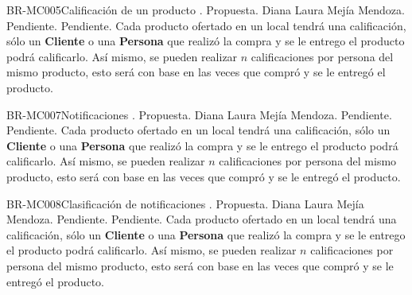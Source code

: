 
\begin{BusinessRule}{BR-MC005}{Calificación de un producto}{}{}{}
	.
	\BRItem[Estado] Propuesta.
	 Diana Laura Mejía Mendoza.
	 Pendiente.
	 Pendiente.
	\BRItem[Descripción] Cada producto ofertado en un local tendrá una calificación, sólo un \textbf{Cliente} o una \textbf{Persona} que realizó la compra y se le entrego el producto podrá calificarlo. Así mismo, se pueden realizar $n$ calificaciones por persona del mismo producto, esto será con base en las veces que compró y se le entregó el producto.
	\BRItem[Sentencia] 
	
\end{BusinessRule}


\begin{BusinessRule}{BR-MC007}{Notificaciones}{}{}{}
	.
	\BRItem[Estado] Propuesta.
	 Diana Laura Mejía Mendoza.
	 Pendiente.
	 Pendiente.
	\BRItem[Descripción] Cada producto ofertado en un local tendrá una calificación, sólo un \textbf{Cliente} o una \textbf{Persona} que realizó la compra y se le entrego el producto podrá calificarlo. Así mismo, se pueden realizar $n$ calificaciones por persona del mismo producto, esto será con base en las veces que compró y se le entregó el producto.
	\BRItem[Sentencia] 
	
\end{BusinessRule}


\begin{BusinessRule}{BR-MC008}{Clasificación de notificaciones}{}{}{}
	.
	\BRItem[Estado] Propuesta.
	 Diana Laura Mejía Mendoza.
	 Pendiente.
	 Pendiente.
	\BRItem[Descripción] Cada producto ofertado en un local tendrá una calificación, sólo un \textbf{Cliente} o una \textbf{Persona} que realizó la compra y se le entrego el producto podrá calificarlo. Así mismo, se pueden realizar $n$ calificaciones por persona del mismo producto, esto será con base en las veces que compró y se le entregó el producto.
	\BRItem[Sentencia] 
	
\end{BusinessRule}